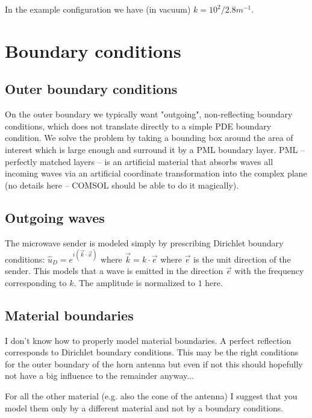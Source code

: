 \documentclass[a4paper,12pt]{paper}
\numberwithin{equation}{section}
\numberwithin{figure}{section}
\begin{document}
In the example configuration we have (in vacuum) $k = 10^2 / 2.8 m^{-1}$.

\section{Boundary conditions}
\subsection{Outer boundary conditions}
On the outer boundary we typically want "outgoing", non-reflecting boundary conditions, which does not translate directly to a simple PDE boundary condition. We solve the problem by taking a bounding box around the area of interest which is large enough and surround it by a PML boundary layer. PML -- perfectly matched layers -- is an artificial material that absorbs waves all incoming waves via an artificial coordinate transformation into the complex plane (no details here -- COMSOL should be able to do it magically).

\subsection{Outgoing waves}
The microwave sender is modeled simply by prescribing Dirichlet boundary conditions: $\hat{u}_D = e^{i (\vec{k} \cdot \vec{x})}$ where $\vec{k} = k \cdot \vec{e}$ where $\vec{e}$ is the unit direction of the sender. This models that a wave is emitted in the direction $\vec{e}$ with the frequency corresponding to $k$. The amplitude is normalized to $1$ here.

\subsection{Material boundaries}
I don't know how to properly model material boundaries.
A perfect reflection corresponds to Dirichlet boundary conditions. This may be the right conditions for the outer boundary of the horn antenna but even if not this should hopefully not have a big influence to the remainder anyway...

For all the other material (e.g. also the cone of the antenna) I suggest that you model them only by a different material and not by a boundary conditions.
\end{document}
